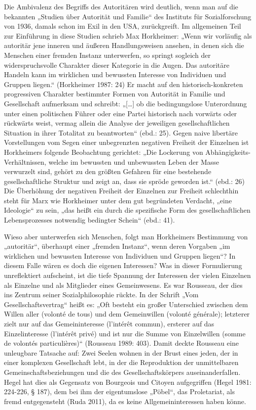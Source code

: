 \begin{multicols*}{2}
Die Ambivalenz des Begriffs des Autoritären wird deutlich, wenn man auf die bekannten „Studien über Autorität und Familie“ des Instituts für Sozialforschung von 1936, damals schon im Exil in den USA, zurückgreift. Im allgemeinen Teil zur Einführung in diese Studien schrieb Max Horkheimer: „Wenn wir vorläufig als autoritär jene inneren und äußeren Handlungsweisen ansehen, in denen sich die Menschen einer fremden Instanz unterwerfen, so springt sogleich der widerspruchsvolle Charakter dieser Kategorie in die Augen. Das autoritäre Handeln kann im wirklichen und bewussten Interesse von Individuen und Gruppen liegen.“ (Horkheimer 1987: 24) Er macht auf den historisch-konkreten progressiven Charakter bestimmter Formen von Autorität in Familie und Gesellschaft aufmerksam und schreibt: „[…] ob die bedingungslose Unterordnung unter einen politischen Führer oder eine Partei historisch nach vorwärts oder rückwärts weist, vermag allein die Analyse der jeweiligen gesellschaftlichen Situation in ihrer Totalitat zu beantworten“ (ebd.: 25). Gegen naive libertäre Vorstellungen vom Segen einer unbegrenzten negativen Freiheit der Einzelnen ist Horkheimers folgende Beobachtung gerichtet: „Die Lockerung von Abhängigkeits-Verhältnissen, welche im bewussten und unbewussten Leben der Masse verwurzelt sind, gehört zu den größten Gefahren für eine bestehende gesellschaftliche Struktur und zeigt an, dass sie spröde geworden ist.“ (ebd.: 26) Die Überhöhung der negativen Freiheit der Einzelnen zur Freiheit schlechthin steht für Marx wie Horkheimer unter dem gut begründeten Verdacht, „eine Ideologie“ zu sein, „das heißt ein durch die spezifische Form des gesellschaftlichen Lebensprozesses notwendig bedingter Schein“ (ebd.: 41).

Wieso aber unterwerfen sich Menschen, folgt man Horkheimers Bestimmung von „autoritär“, überhaupt einer „fremden Instanz“, wenn deren Vorgaben „im wirklichen und bewussten Interesse von Individuen und Gruppen liegen“?  In diesem Falle wären es doch die eigenen Interessen? Was in dieser Formulierung unreflektiert aufscheint, ist die tiefe Spannung der Interessen der vielen Einzelnen als Einzelne und als Mitglieder eines Gemeinwesens. Es war Rousseau, der dies ins Zentrum seiner Sozialphilosophie rückte. In der Schrift „Vom Gesellschaftsvertrag“ heißt es: „Oft besteht ein großer Unterschied zwischen dem Willen aller (volonté de tous) und dem Gemeinwillen (volonté générale); letzterer zielt nur auf das Gemeininteresse (l'intérêt commun), ersterer auf das Einzelinteresse (l'intérêt privé) und ist nur die Summe von Einzelwillen (somme de volontés particulières)“ (Rousseau 1989: 403). Damit deckte Rousseau eine unleugbare Tatsache auf: Zwei Seelen wohnen in der Brust eines jeden, der in einer komplexen Gesellschaft lebt, in der die Reproduktion der unmittelbaren Gemeinschaftsbeziehungen und die des Gesellschaftskörpers auseinanderfallen. Hegel hat dies als Gegensatz von Bourgeois und Citoyen aufgegriffen (Hegel 1981: 224-226, § 187), dem bei ihm der eigentumslose „Pöbel“, das Proletariat, als fremd entgegensteht (Ruda 2011), da es keine Allgemeininteressen haben könne. 


\end{multicols*}
